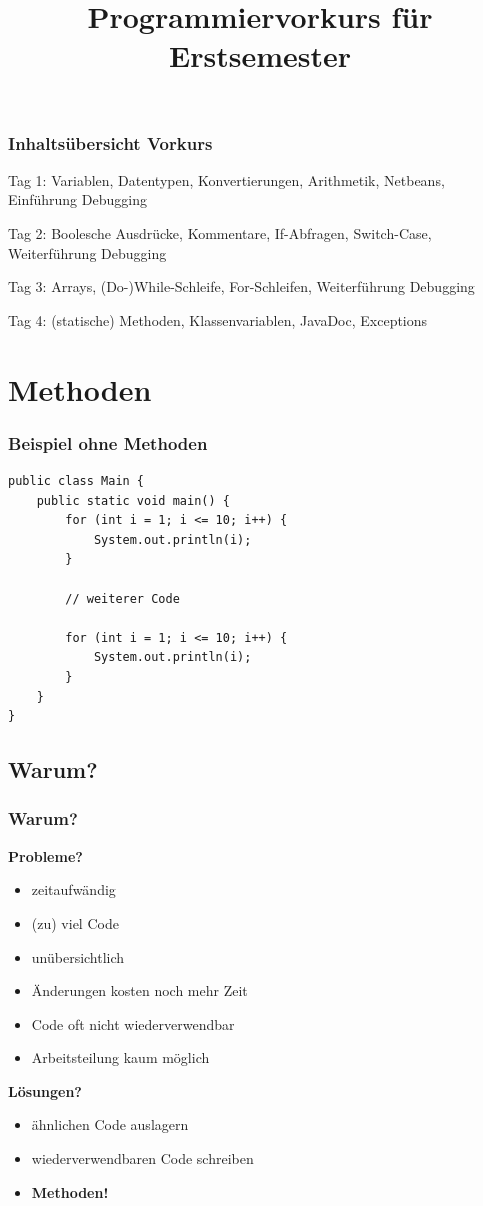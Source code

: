 \documentclass[final]{beamer}
\title{Programmiervorkurs für Erstsemester}
\begin{document}
\lstset{tabsize=4}
\lstset{basicstyle=\small}
\lstset{language=java}

\begin{frame}
  \titlepage
\end{frame}

\begin{frame}
	\frametitle{Inhaltsübersicht Vorkurs}
	\begin{itemize}
	{\color{gray}
		\item {Tag 1: Variablen, Datentypen, Konvertierungen, Arithmetik, Netbeans, Einführung Debugging}
		\item {Tag 2: Boolesche Ausdrücke, Kommentare, If-Abfragen, Switch-Case, Weiterführung Debugging}
		\item {Tag 3: Arrays, (Do-)While-Schleife, For-Schleifen, Weiterführung Debugging}
		{\color{black}
		\item {Tag 4: (statische) Methoden, Klassenvariablen, JavaDoc, Exceptions}
		}
	}
	\end{itemize}
\end{frame}

\section{Methoden}
\begin{frame}[containsverbatim]
	\frametitle{Beispiel ohne Methoden}
	\begin{lstlisting}
public class Main {
	public static void main() {
		for (int i = 1; i <= 10; i++) {
			System.out.println(i);
		}
		
		// weiterer Code
		
		for (int i = 1; i <= 10; i++) {
			System.out.println(i);
		}
	}
}
	\end{lstlisting}
\end{frame}

\subsection{Warum?}
\begin{frame}
	\frametitle{Warum?}
	\textbf{Probleme?}
	\begin{itemize}
		\item{zeitaufwändig}
		\item{(zu) viel Code}
		\item{unübersichtlich}
		\item{Änderungen kosten noch mehr Zeit}
		\item{Code oft nicht wiederverwendbar}
		\item{Arbeitsteilung kaum möglich}
	\end{itemize}
	\pause
	\vspace{\baselineskip}
	\textbf{Lösungen?}
	\pause
	\begin{itemize}
		\item{ähnlichen Code auslagern}
		\item{wiederverwendbaren Code schreiben}
		\item{\textbf{Methoden!}}
	\end{itemize}
\end{frame}
\end{document}
